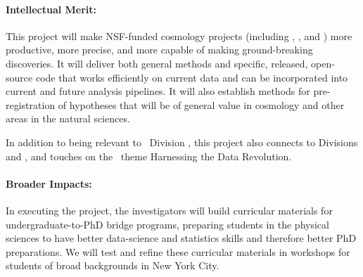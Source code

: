 \documentclass[12pt, fullpage, letterpaper]{article}
\begin{document}
\paragraph{Intellectual Merit:}
This project will make NSF-funded cosmology projects (including
\SDSSIV, \DESI, and \LSST) more productive, more precise, and more
capable of making ground-breaking discoveries.
It will deliver both general methods and specific, released,
open-source code that works efficiently on current data and can be
incorporated into current and future analysis pipelines.
It will also establish methods for pre-registration of hypotheses that
will be of general value in cosmology and other areas in the natural
sciences.

In addition to being relevant to \NSF\ Division , this project also
connects to Divisions  and , and touches on the \NSF\ theme
Harnessing the Data Revolution.

\paragraph{Broader Impacts:}
In executing the project, the investigators will build curricular
materials for undergraduate-to-PhD bridge programs, preparing students
in the physical sciences to have better data-science and statistics
skills and therefore better PhD preparations.
We will test and refine these curricular materials in workshops for
students of broad backgrounds in New York City.
\end{document}
